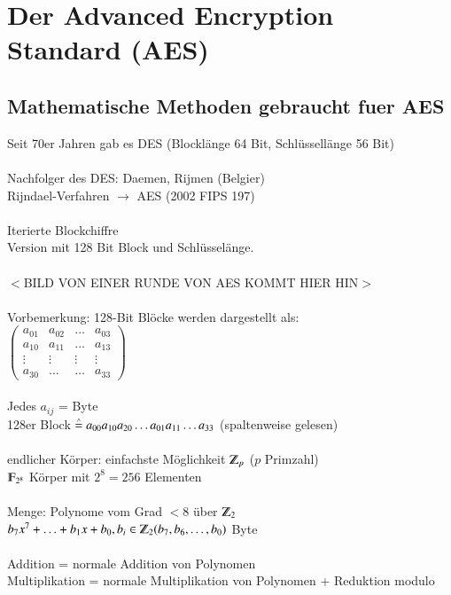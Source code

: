 \chapter{Der Advanced Encryption Standard (AES)}
\section{Mathematische Methoden gebraucht fuer AES} %
Seit 70er Jahren gab es DES (Blockl\"ange 64 Bit, Schl\"ussell\"ange 56 Bit) \\
\\
Nachfolger des DES: Daemen, Rijmen (Belgier)\\
Rijndael-Verfahren $\rightarrow$ AES (2002 FIPS 197)\\
\\
Iterierte Blockchiffre\\
Version mit 128 Bit Block und Schl\"ussel\"ange. \\
\\
$<$BILD VON EINER RUNDE VON AES KOMMT HIER HIN$>$\\
\\
Vorbemerkung: 128-Bit Bl\"ocke werden dargestellt als:\\
$\begin{pmatrix}
	a_{01} & a_{02} & \ldots & a_{03} \\
	a_{10} & a_{11} & \ldots & a_{13}\\
	\vdots & \vdots  & \vdots & \vdots \\
	a_{30} & \ldots  & \ldots & a_{33}
\end{pmatrix}$\\
\\
Jedes $a_{ij}$ = Byte\\
128er Block $\stackrel{\scriptscriptstyle\wedge}{=} a_{00}a_{10}a_{20}\ldots a_{01}a_{11}\ldots a_{33}$ (spaltenweise gelesen)\\
\\
endlicher K\"orper: einfachste M\"oglichkeit $\Z_p$ ($p$ Primzahl)\\
$\F_{2^8}$ K\"orper mit $2^8 = 256$ Elementen\\
\\
Menge: Polynome vom Grad $< 8$ \"uber $\Z_2$\\
$b_7x^7 + \ldots + b_1x + b_0, b_i \in \Z_2 \\
(b_7, b_6, \ldots, b_0)$ Byte\\
\\
Addition = normale Addition von Polynomen\\
Multiplikation = normale Multiplikation von Polynomen + Reduktion modulo \\
